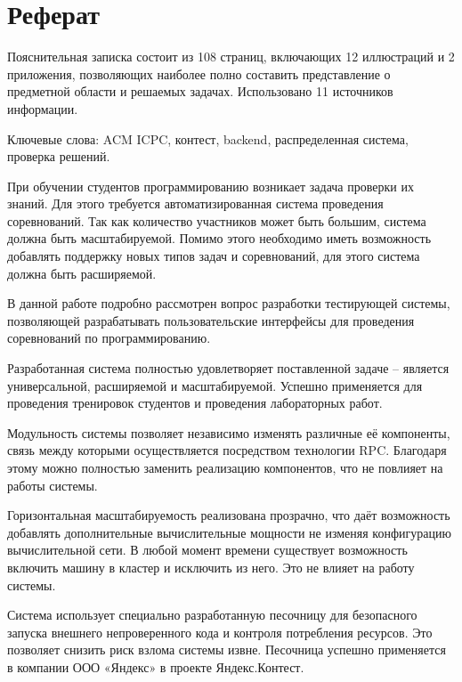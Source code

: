 \chapter*{Реферат}
Пояснительная записка состоит из
108 страниц, включающих 12 иллюстраций и 2 приложения,
позволяющих наиболее полно составить представление о предметной области и решаемых задачах.
Использовано 11 источников информации.

Ключевые слова: ACM ICPC, контест, backend, распределенная система, проверка решений.

При обучении студентов программированию возникает задача
проверки их знаний. Для этого требуется автоматизированная система
проведения соревнований. Так как количество участников
может быть большим, система должна быть масштабируемой.
Помимо этого необходимо иметь возможность добавлять поддержку
новых типов задач и соревнований, для этого
система должна быть расширяемой.


В данной работе подробно рассмотрен вопрос разработки тестирующей системы,
позволяющей разрабатывать пользовательские интерфейсы
для проведения соревнований по программированию.

Разработанная система полностью удовлетворяет поставленной задаче --
является универсальной, расширяемой и масштабируемой.
Успешно применяется для проведения тренировок студентов
и проведения лабораторных работ.

Модульность системы позволяет независимо изменять различные её компоненты,
связь между которыми осуществляется посредством технологии RPC.
Благодаря этому можно полностью заменить реализацию компонентов,
что не повлияет на работы системы.

Горизонтальная масштабируемость реализована прозрачно,
что даёт возможность добавлять дополнительные
вычислительные мощности не изменяя конфигурацию вычислительной сети.
В любой момент времени существует возможность включить машину в кластер
и исключить из него. Это не влияет на работу системы.

Система использует специально разработанную песочницу для
безопасного запуска внешнего непроверенного кода и контроля потребления ресурсов.
Это позволяет снизить риск взлома системы извне.
Песочница успешно применяется в компании ООО «Яндекс» в проекте Яндекс.Контест.
